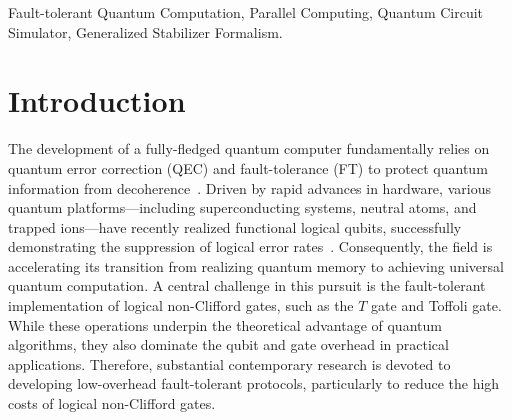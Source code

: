 \documentclass[10pt,conference]{IEEEtran}
\begin{document}
\begin{abstract}
Circuit simulation tools are critical for developing and assessing quantum-error-correcting and fault-tolerant strategies. In this work, we present SOFT, a high-performance SimulatOr for universal Fault-Tolerant quantum circuits. Integrating the generalized stabilizer formalism and highly optimized GPU parallelization, SOFT enables the simulation of noisy quantum circuits containing non-Clifford gates at a scale not accessible with existing tools. To provide a concrete demonstration, we simulate the state-of-the-art magic state cultivation (MSC) protocol at code distance $d=5$, involving 42 qubits, 72 $T$ / $T^\dagger$ gates, and mid-circuit measurements. Using only modest GPU resources, SOFT performs over 200 billion shots and achieves the first ground-truth simulation of the cultivation protocol at a non-trivial scale. 
This endeavor not only certifies the MSC's effectiveness for generating high-fidelity logical $T$-states, but also reveals a large discrepancy between the actual logical error rate and the previously reported values. 
Our work demonstrates the importance of reliable simulation tools for fault-tolerant architecture design, advancing the field from simulating quantum memory to simulating a universal quantum computer.
\end{abstract}

\begin{IEEEkeywords}
Fault-tolerant Quantum Computation, Parallel Computing, Quantum Circuit Simulator, Generalized Stabilizer Formalism. 
\end{IEEEkeywords}

\section{Introduction}
The development of a fully-fledged quantum computer fundamentally relies on quantum error correction (QEC) and fault-tolerance (FT) to protect quantum information from decoherence~\cite{Dennis02, Shor95, Steane96,Gottesman98}.
Driven by rapid advances in hardware, various quantum platforms—including superconducting systems, neutral atoms, and trapped ions—have recently realized functional logical qubits, successfully demonstrating the suppression of logical error rates~\cite{Google25,He25,Moses23,Bluvstein24}.
Consequently, the field is accelerating its transition from realizing quantum memory to achieving universal quantum computation. A central challenge in this pursuit is the fault-tolerant implementation of logical non-Clifford gates, such as the $T$ gate and Toffoli gate. While these operations underpin the theoretical advantage of quantum algorithms, they also dominate the qubit and gate overhead in practical applications. Therefore, substantial contemporary research is devoted to developing low-overhead fault-tolerant protocols, particularly to reduce the high costs of logical non-Clifford gates.
\end{document}
